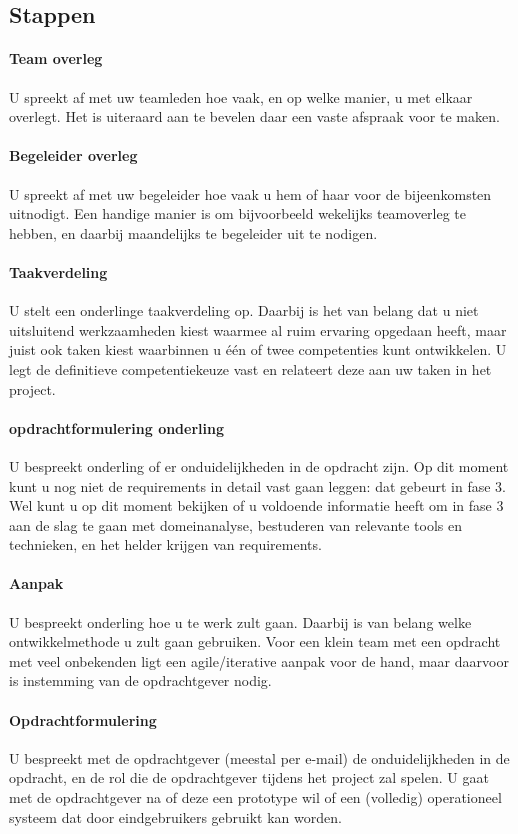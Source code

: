 \subsection{Stappen}

\paragraph{Team overleg}
U spreekt af met uw teamleden hoe vaak, en op welke manier, u met elkaar
overlegt. Het is uiteraard aan te bevelen daar een vaste afspraak
voor te maken.
\paragraph{Begeleider overleg}
U spreekt af met uw begeleider hoe vaak u hem of haar voor de
bijeenkomsten uitnodigt. Een handige manier is om bijvoorbeeld
wekelijks
teamoverleg te hebben, en daarbij maandelijks te begeleider uit te
nodigen.
\paragraph{Taakverdeling}
U stelt een onderlinge taakverdeling op. Daarbij is het van belang dat u
niet uitsluitend werkzaamheden kiest waarmee al ruim ervaring
opgedaan heeft, maar juist ook taken kiest waarbinnen u één of
twee competenties kunt ontwikkelen. U legt de definitieve competentiekeuze
vast en relateert deze aan uw taken in het project.
\paragraph{opdrachtformulering onderling}
U bespreekt onderling of er onduidelijkheden in de opdracht zijn. Op dit
moment kunt u nog niet de requirements in detail vast gaan leggen:
dat gebeurt
in fase 3. Wel kunt u op dit moment bekijken of u voldoende
informatie heeft om in fase 3 aan de slag te gaan met domeinanalyse,
bestuderen van relevante tools en technieken, en het helder krijgen
van requirements.
\paragraph{Aanpak}
U bespreekt onderling hoe u te werk zult gaan. Daarbij is van belang
welke ontwikkelmethode u zult gaan gebruiken. Voor een klein team
met een opdracht met veel onbekenden ligt een agile/iterative aanpak
voor de hand, maar daarvoor is instemming van de opdrachtgever nodig.
\paragraph{Opdrachtformulering}
U bespreekt met de opdrachtgever (meestal per e-mail) de
onduidelijkheden in de opdracht, en de rol die de opdrachtgever
tijdens het project zal spelen.
U gaat met de opdrachtgever na of deze een prototype wil of een
(volledig) operationeel systeem dat door eindgebruikers gebruikt kan
worden.
